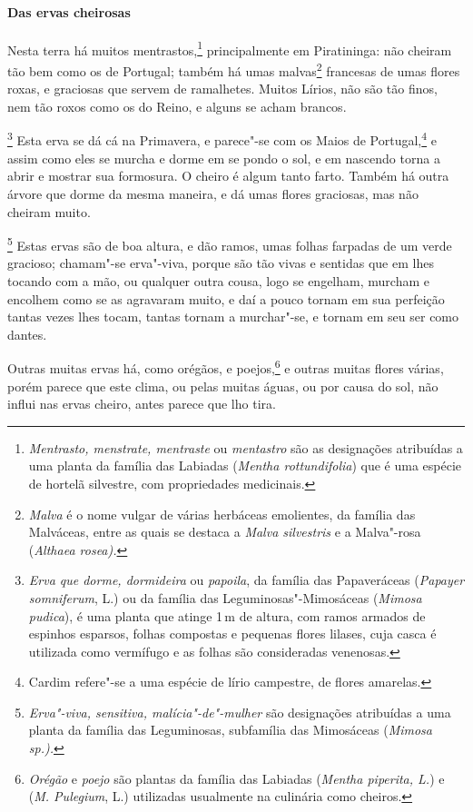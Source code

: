 \begin{linenumbers}
\paragraph{Das ervas cheirosas}\quad
Nesta terra há muitos mentrastos,\footnote{ \textit{Mentrasto,
menstrate, mentraste} ou \textit{mentastro} são as designações
atribuídas a uma planta da família das Labiadas (\textit{Mentha
rottundifolia}) que é uma espécie de hortelã silvestre, com
propriedades medicinais.} principalmente em Piratininga: não cheiram
tão bem como os de Portugal; também há umas malvas\footnote{ \textit{Malva} 
é o nome vulgar de várias herbáceas emolientes, da
família das Malváceas, entre as quais se destaca a \textit{Malva
silvestris} e a Malva"-rosa (\textit{Althaea rosea).}} francesas de umas
flores roxas, e graciosas que servem de ramalhetes. Muitos Lírios, não
são tão finos, nem tão roxos como os do Reino, e alguns se acham brancos.

\footnote{ \textit{Erva que dorme, dormideira}
ou \textit{papoila}, da família das Papaveráceas (\textit{Papayer
somniferum}, L.) ou da família das Leguminosas"-Mimosáceas
(\textit{Mimosa pudica}), é uma planta que atinge 1\,m de altura, com
ramos armados de espinhos esparsos, folhas compostas e pequenas flores
lilases, cuja casca é utilizada como vermífugo e as folhas são
consideradas venenosas.} Esta erva se dá cá na Primavera, e
parece"-se com os Maios de Portugal,\footnote{ Cardim refere"-se a uma
espécie de lírio campestre, de flores amarelas.} e assim como eles se
murcha e dorme em se pondo o sol, e em nascendo torna a abrir e mostrar
sua formosura. O cheiro é algum tanto farto. Também há outra árvore que
dorme da mesma maneira, e dá umas flores graciosas, mas não cheiram muito.

\footnote{ \textit{Erva"-viva, sensitiva,
malícia"-de"-mulher} são designações atribuídas a uma planta da família 
das Leguminosas, subfamília das Mimosáceas (\textit{Mimosa
sp.).}} Estas ervas são de boa altura, e dão ramos, umas
folhas farpadas de um verde gracioso; chamam"-se erva"-viva, porque são
tão vivas e sentidas que em lhes tocando com a mão, ou qualquer outra
cousa, logo se engelham, murcham e encolhem como se as agravaram muito,
e daí a pouco tornam em sua perfeição tantas vezes lhes tocam, tantas
tornam a murchar"-se, e tornam em seu ser como dantes.

 Outras muitas ervas há, como orégãos, e poejos,\footnote{ \textit{Orégão} 
e \textit{poejo} são plantas da família das Labiadas
(\textit{Mentha piperita, L.}) e (\textit{M. Pulegium}, L.) utilizadas
usualmente na culinária como cheiros.} e outras muitas flores várias,
porém parece que este clima, ou pelas muitas águas, ou por causa do
sol, não influi nas ervas cheiro, antes parece que lho tira.


\end{linenumbers}
